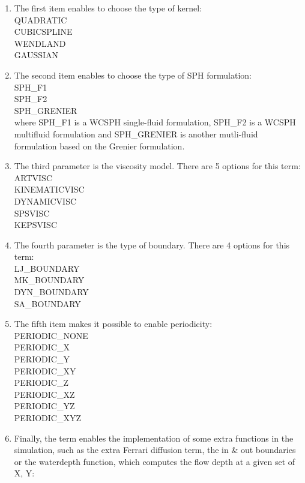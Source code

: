 \begin{enumerate}
\item The first item enables to choose the type of kernel:\\
QUADRATIC\\
CUBICSPLINE\\
WENDLAND\\
GAUSSIAN\\
\item The second item enables to choose the type of SPH formulation:\\
SPH\_F1\\
SPH\_F2\\
SPH\_GRENIER\\
where SPH\_F1 is a WCSPH single-fluid formulation, SPH\_F2 is a WCSPH multifluid formulation and
SPH\_GRENIER is another mutli-fluid formulation based on the Grenier formulation.
\item The third parameter is the viscosity model. There are 5 options for this term: \\
ARTVISC\\
KINEMATICVISC\\
DYNAMICVISC\\
SPSVISC\\
KEPSVISC\\
\item The fourth parameter is the type of boundary. There are 4 options for this term:\\
LJ\_BOUNDARY\\
MK\_BOUNDARY\\
DYN\_BOUNDARY\\
SA\_BOUNDARY\\
\item The fifth item makes it possible to enable periodicity:\\
  PERIODIC\_NONE \\
  PERIODIC\_X \\
  PERIODIC\_Y \\
  PERIODIC\_XY \\
  PERIODIC_Z \\
  PERIODIC_XZ \\
  PERIODIC_YZ \\
  PERIODIC_XYZ \\
\item Finally, the  term enables the implementation 
of some extra functions in the simulation, such as the extra Ferrari diffusion term, 
the in \& out boundaries or the waterdepth function, 
which computes the flow depth at a given set of X, Y:\\

\end{enumerate}

